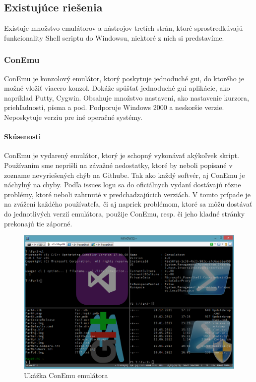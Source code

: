 \subsection{Existujúce riešenia}
\indent
Existuje množstvo emulátorov a nástrojov tretích strán, ktoré sprostredkúvajú funkcionality Shell scriptu do Windowsu, niektoré z nich si predstavíme.

\subsubsection{ConEmu}
\indent ConEmu je konzolový emulátor, ktorý poskytuje jednoduché \acrshort{gui}, do ktorého je možné vložiť viacero konzol. Dokáže spúšťať jednoduché \acrshort{gui} aplikácie, ako napríklad Putty, Cygwin. Obsahuje množstvo nastavení, ako nastavenie kurzora, priehľadnosti, písma a pod. Podporuje Windows 2000 a neskoršie verzie. Neposkytuje verziu pre iné operačné systémy. \cite{conemu}
\paragraph{Skúsenosti}
\indent ConEmu je vydarený emulátor, ktorý je schopný vykonávať akýkoľvek skript. Používaním sme neprišli na závažné nedostatky, ktoré by neboli popísané v zozname nevyriešených chýb na Githube. Tak ako každý softvér, aj ConEmu je náchylný na chyby. Podľa issues logu sa do oficiálnych vydaní dostávajú rôzne problémy, ktoré neboli zahrnuté v predchadzajúcich verziách. V tomto prípade je na zvážení každého používateľa, či aj napriek problémom, ktoré sa môžu dostávať do jednotlivých verzií emulátora, použije ConEmu, resp. či jeho kladné stránky prekonajú tie záporné.

\begin{figure}[!htbp]
	\centering
	\includegraphics[scale=0.3]{img/conEmuImg.jpg}
	\caption{Ukážka ConEmu emulátora}
	\label{fig:test}
\end{figure}
\newpage
